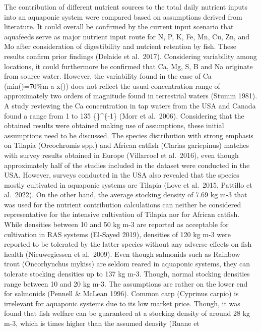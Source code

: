 \documentclass[preprint, 3p,
authoryear]{elsarticle} %
\begin{document}
The contribution of different nutrient sources to the total daily
nutrient inputs into an aquaponic system were compared based on
assumptions derived from literature. It could overall be confirmed by
the current input scenario that aquafeeds serve as major nutrient input
route for N, P, K, Fe, Mn, Cu, Zn, and Mo after consideration of
digestibility and nutrient retention by fish. These results confirm
prior findings (Delaide et al.~2017). Considering variability among
locations, it could furthermore be confirmed that Ca, Mg, S, B and Na
originate from source water. However, the variability found in the case
of Ca \left(min\left(\right)=70\%\cdot m a
x\left(\right)\right) does not reflect the usual
concentration range of approximately two orders of magnitude found in
terrestrial waters (Stumm 1981). A study reviewing the Ca concentration
in tap waters from the USA and Canada found a range from 1 to 135
\{\}\^{}\{-1\} (Morr et al.~2006). Considering that the
obtained results were obtained making use of assumptions, these initial
assumptions need to be discussed. The species distribution with strong
emphasis on Tilapia (Oreochromis spp.) and African catfish (Clarias
gariepinus) matches with survey results obtained in Europe (Villarroel
et al.~2016), even though approximately half of the studies included in
the dataset were conducted in the USA. However, surveys conducted in the
USA also revealed that the species mostly cultivated in aquaponic
systems are Tilapia (Love et al.~2015, Pattillo et al.~2022). On the
other hand, the average stocking density of 7.69 kg m-3 that was used
for the nutrient contribution calculations can neither be considered
representative for the intensive cultivation of Tilapia nor for African
catfish. While densities between 10 and 50 kg m-3 are reported as
acceptable for cultivation in RAS systems (El-Sayed 2019), densities of
120 kg m-3 were reported to be tolerated by the latter species without
any adverse effects on fish health (Nieuwegiessen et al.~2009). Even
though salmonids such as Rainbow trout (Oncorhynchus mykiss) are seldom
reared in aquaponic systems, they can tolerate stocking densities up to
137 kg m-3. Though, normal stocking densities range between 10 and 20 kg
m-3. The assumptions are rather on the lower end for salmonids (Pennell
\& McLean 1996). Common carp (Cyprinus carpio) is irrelevant for
aquaponic systems due to its low market price. Though, it was found that
fish welfare can be guaranteed at a stocking density of around 28 kg
m-3, which is  times higher than the assumed density (Ruane et
\end{document}
